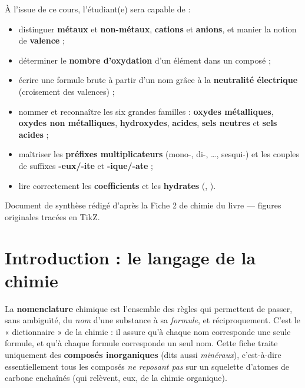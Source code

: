 \documentclass[11pt,a4paper]{article}
\begin{document}
\begin{tcolorbox}[boxbase,colback=primary!5,colframe=primary,width=15.2cm,
    title={\textsc{Objectifs pédagogiques de la fiche}}]
À l'issue de ce cours, l'étudiant(e) sera capable de :
\begin{itemize}[leftmargin=1.6em,topsep=2pt,itemsep=1pt]
  \item distinguer \textbf{métaux} et \textbf{non-métaux}, \textbf{cations} et \textbf{anions}, et manier la notion de \textbf{valence} ;
  \item déterminer le \textbf{nombre d'oxydation} d'un élément dans un composé ;
  \item écrire une formule brute à partir d'un nom grâce à la \textbf{neutralité électrique} (croisement des valences) ;
  \item nommer et reconnaître les six grandes familles : \textbf{oxydes métalliques}, \textbf{oxydes non métalliques}, \textbf{hydroxydes}, \textbf{acides}, \textbf{sels neutres} et \textbf{sels acides} ;
  \item maîtriser les \textbf{préfixes multiplicateurs} (mono-, di-, \ldots, sesqui-) et les couples de suffixes \textbf{-eux/-ite} et \textbf{-ique/-ate} ;
  \item lire correctement les \textbf{coefficients} et les \textbf{hydrates} (, ).
\end{itemize}
\end{tcolorbox}

\vspace{0.4cm}
{\small\color{black!60} Document de synthèse rédigé d'après la Fiche 2 de chimie du livre — figures originales tracées en TikZ.}
\par
\endgroup

\newpage
\renewcommand{\contentsname}{\textcolor{primarydark}{Table des matières}}
\tableofcontents
\thispagestyle{fancy}
\newpage

\section{Introduction : le langage de la chimie}
La \textbf{nomenclature} chimique est l'ensemble des règles qui permettent de passer, sans ambiguïté,
du \emph{nom} d'une substance à sa \emph{formule}, et réciproquement. C'est le « dictionnaire » de la
chimie : il assure qu'à chaque nom corresponde une seule formule, et qu'à chaque formule corresponde un
seul nom. Cette fiche traite uniquement des \textbf{composés inorganiques} (dits aussi \emph{minéraux}),
c'est-à-dire essentiellement tous les composés \emph{ne reposant pas} sur un squelette d'atomes de
carbone enchaînés (qui relèvent, eux, de la chimie organique).
\end{document}
